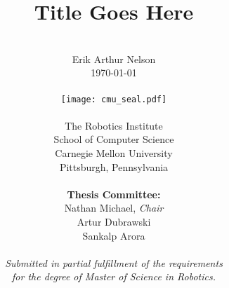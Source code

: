 \author{
  \\
        Erik Arthur Nelson \\
        \today \\
  \\
        \texttt{[image: cmu\_seal.pdf]}
  \\
  \\
        The Robotics Institute \\
        School of Computer Science \\
        Carnegie Mellon University \\
        Pittsburgh, Pennsylvania \\
  \\
        {\bf Thesis Committee:} \\
        Nathan Michael, {\it Chair} \\
        Artur Dubrawski \\
        Sankalp Arora \\
  \\
        \textit{Submitted in partial fulfillment of the requirements} \\
        \textit{for the degree of Master of Science in Robotics.}
}

\title{\bf{
  Title Goes Here
}}

\date{}
